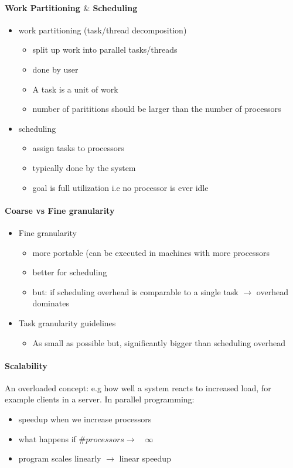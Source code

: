 \documentclass[8pt]{extreport}
\begin{document}
\paragraph{Work Partitioning $\&$ Scheduling}
\begin{itemize}
\item work partitioning (task/thread decomposition)
\begin{itemize}
\item split up work into parallel tasks/threads
\item done by user
\item A task is a unit of work
\item number of parititions should be larger than the number of processors
\end{itemize}
\item scheduling
\begin{itemize}
\item assign tasks to processors
\item typically done by the system
\item goal is full utilization i.e no processor is ever idle
\end{itemize}
\end{itemize}
\paragraph{Coarse vs Fine granularity}
\begin{itemize}
\item Fine granularity
\begin{itemize}
\item more portable (can be executed in machines with more processors
\item better for scheduling
\item but: if scheduling overhead is comparable to a single task $\rightarrow$ overhead dominates
\end{itemize}
\item Task granularity guidelines
\begin{itemize}
\item As small as possible but, significantly bigger than scheduling overhead
\end{itemize}
\end{itemize}
\paragraph{Scalability} An overloaded concept: e.g how well a system reacts to increased load, for example clients in a server. In parallel programming:
\begin{itemize}
\item speedup when we increase processors
\item what happens if $\# processors \rightarrow \quad \infty$
\item program scales linearly $\rightarrow$ linear speedup
\end{itemize}
\end{document}
